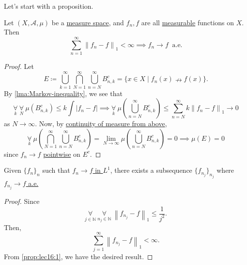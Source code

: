 Let's start with a proposition.

\begin{proposition}\label{prop:lec16:1}
	Let \((X, \mathcal{A} , \mu )\) be a \hyperref[def:measure-space]{measure space}, and \(f_{n}, f\) are all \hyperref[def:measurable-function]{measurable}
	functions on \(X\). Then
	\[
		\sum_{n=1}^{\infty} \left\lVert f_{n} - f\right\rVert_1 < \infty \implies \hyperref[def:converge-almost-everywhere]{f_{n}\to f\ \text{ a.e.}}
	\]
\end{proposition}
\begin{proof}
	Let
	\[
		E \coloneqq \bigcup_{k=1}^{\infty} \bigcap_{N=1}^{\infty} \bigcup_{n=N}^{\infty} B_{n, k}^{c} = \{x\in X \mid f_{n}(x)\nrightarrow f(x)\}.
	\]
	By \autoref{lma:Markov-inequality}, we see that
	\[
		\underset{k}{\forall }\ \underset{N}{\forall }\ \mu \left(B_{n, k}^{c} \right) \leq k \int \left\vert f_{n} - f \right\vert \implies \underset{k}{\forall }\ \mu \left(\bigcup_{n=N}^{\infty} B_{n, k}^{c} \right)\leq \sum_{n=N}^{\infty} k\left\lVert f_{n} - f\right\rVert_1 \to 0
	\]
	as \(N\to \infty \). Now, by \hyperref[thm:measure-space-continuity-from-above]{continuity of measure from above},
	\[
		\underset{k}{\forall }\ \mu \left(\bigcap_{N=1}^{\infty} \bigcup_{n=N}^{\infty} B_{n, k}^{c} \right)= \lim_{N \to \infty} \mu \left(\bigcup_{n=N}^{\infty} B_{n, k}^{c} \right) = 0 \implies \mu (E) = 0
	\]
	since \(f_{n}\to f\) \hyperref[def:pointwise-convergence]{pointwise} on \(E^{c} \).
\end{proof}

\begin{corollary}
	Given \(\{f_{n}\}_n\) such that \hyperref[def:converge-in-L-1]{\(f_{n}\to f\) in \(L^1\)}, there exists a subsequence \(\{f_{n_{j}}\}_{n_{j}}\) where
	\hyperref[def:converge-almost-everywhere]{\(f_{n_{j}}\to f\) a.e.}
\end{corollary}
\begin{proof}
	Since
	\[
		\underset{j\in \mathbb{N} }{\forall }\ \underset{n_{j}\in \mathbb{N} }{\forall }\ \left\lVert f_{n_{j}} - f\right\rVert _1 \leq \frac{1}{j^{2} }.
	\]
	Then,
	\[
		\sum_{j=1}^{\infty} \left\lVert f_{n_{j}} - f\right\rVert _1 < \infty.
	\]
	From \autoref{prop:lec16:1}, we have the desired result.
\end{proof}

